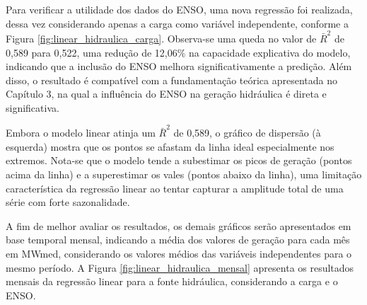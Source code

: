 Para verificar a utilidade dos dados do ENSO, uma nova regressão foi realizada, dessa vez
considerando apenas a carga como variável independente, conforme a Figura \ref{fig:linear_hidraulica_carga}. Observa-se 
uma queda no valor de $\bar{R}^2$ de 0,589 para 0,522, uma redução de 12,06\% na capacidade explicativa do modelo, indicando que a 
inclusão do ENSO melhora significativamente a predição. Além disso, o resultado é compatível com a fundamentação teórica 
apresentada no Capítulo 3, na qual a influência do ENSO na geração hidráulica é direta e significativa.

\begin{figure}[!ht]
  {}
  {}
\end{figure}

Embora o modelo linear atinja um $\bar{R}^2$ de 0,589, o gráfico de dispersão (à esquerda) mostra que os pontos se 
afastam da linha ideal especialmente nos extremos. Nota-se que o modelo tende a subestimar os picos de geração 
(pontos acima da linha) e a superestimar os vales (pontos abaixo da linha), uma limitação característica da regressão 
linear ao tentar capturar a amplitude total de uma série com forte sazonalidade.

A fim de melhor avaliar os resultados, os demais gráficos serão apresentados em base temporal mensal, indicando a média 
dos valores de geração para cada mês em MWmed, considerando os valores médios das variáveis independentes para o mesmo período. 
A Figura \ref{fig:linear_hidraulica_mensal} apresenta os resultados mensais da regressão linear para a fonte hidráulica, 
considerando a carga e o ENSO. 

\begin{figure}[!ht]
  {}
  {}
\end{figure}
\begin{figure}[!ht]
  {}
  {}
\end{figure}

